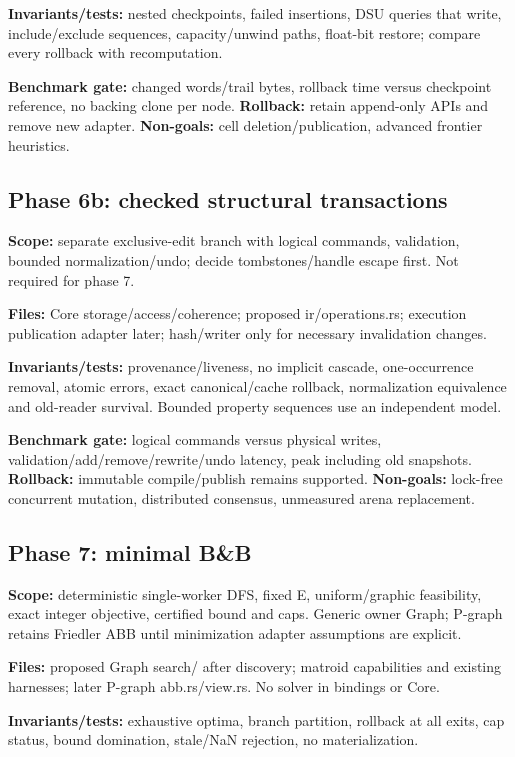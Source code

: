 \documentclass[10pt,a4paper]{article}
\begin{document}
\textbf{Invariants/tests:} nested checkpoints, failed insertions, DSU queries that write, include/exclude sequences, capacity/unwind paths, float-bit restore; compare every rollback with recomputation.

\textbf{Benchmark gate:} changed words/trail bytes, rollback time versus checkpoint reference, no backing clone per node. \textbf{Rollback:} retain append-only APIs and remove new adapter. \textbf{Non-goals:} cell deletion/publication, advanced frontier heuristics.

\subsection{Phase 6b: checked structural transactions}
\textbf{Scope:} separate exclusive-edit branch with logical commands, validation, bounded normalization/undo; decide tombstones/handle escape first. Not required for phase 7.

\textbf{Files:} Core storage/access/coherence; proposed ir/operations.rs; execution publication adapter later; hash/writer only for necessary invalidation changes.

\textbf{Invariants/tests:} provenance/liveness, no implicit cascade, one-occurrence removal, atomic errors, exact canonical/cache rollback, normalization equivalence and old-reader survival. Bounded property sequences use an independent model.

\textbf{Benchmark gate:} logical commands versus physical writes, validation/add/remove/rewrite/undo latency, peak including old snapshots. \textbf{Rollback:} immutable compile/publish remains supported. \textbf{Non-goals:} lock-free concurrent mutation, distributed consensus, unmeasured arena replacement.

\subsection{Phase 7: minimal B\&B}
\textbf{Scope:} deterministic single-worker DFS, fixed E, uniform/graphic feasibility, exact integer objective, certified bound and caps. Generic owner Graph; P-graph retains Friedler ABB until minimization adapter assumptions are explicit.

\textbf{Files:} proposed Graph search/ after discovery; matroid capabilities and existing harnesses; later P-graph abb.rs/view.rs. No solver in bindings or Core.

\textbf{Invariants/tests:} exhaustive optima, branch partition, rollback at all exits, cap status, bound domination, stale/NaN rejection, no materialization.
\end{document}
